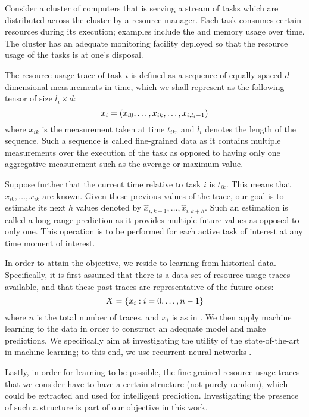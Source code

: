 Consider a cluster of computers that is serving a stream of tasks which are
distributed across the cluster by a resource manager. Each task consumes certain
resources during its execution; examples include the  and memory usage
over time. The cluster has an adequate monitoring facility deployed so that the
resource usage of the tasks is at one's disposal.

The resource-usage trace of task $i$ is defined as a sequence of equally spaced
$d$-dimensional measurements in time, which we shall represent as the following
tensor of size $l_i \times d$:
\begin{equation} \elab{trace}
  x_i = \left(x_{i0}, \dots, x_{ik}, \dots, x_{i,l_i - 1}\right)
\end{equation}
where $x_{ik}$ is the measurement taken at time $t_{ik}$, and $l_i$ denotes the
length of the sequence. Such a sequence is called fine-grained data as it
contains multiple measurements over the execution of the task as opposed to
having only one aggregative measurement such as the average or maximum value.

Suppose further that the current time relative to task $i$ is $t_{ik}$. This
means that $x_{i0}, \dots, x_{ik}$ are known. Given these previous values of the
trace, our goal is to estimate its next $h$ values denoted by $\hat{x}_{i,k +
1}, \dots, \hat{x}_{i,k + h}$. Such an estimation is called a long-range
prediction as it provides multiple future values as opposed to only one. This
operation is to be performed for each active task of interest at any time moment
of interest.

In order to attain the objective, we reside to learning from historical data.
Specifically, it is first assumed that there is a data set of resource-usage
traces available, and that these past traces are representative of the future
ones:
\begin{equation} \elab{traces}
  X = \{ x_i: i = 0, \dots, n - 1 \}
\end{equation}
where $n$ is the total number of traces, and $x_i$ is as in . We
then apply machine learning to the data in order to construct an adequate model
and make predictions. We specifically aim at investigating the utility of the
state-of-the-art in machine learning; to this end, we use recurrent neural
networks \cite{goodfellow2016}.

Lastly, in order for learning to be possible, the fine-grained resource-usage
traces that we consider have to have a certain structure (not purely random),
which could be extracted and used for intelligent prediction. Investigating the
presence of such a structure is part of our objective in this work.
